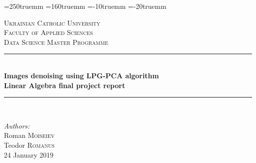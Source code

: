 \textheight=250truemm \textwidth=160truemm 
\hoffset=-10truemm \voffset=-20truemm



\begin{titlepage}

\newcommand{\HRule}{\rule{\linewidth}{0.5mm}} %

\center %
 

\textsc{\LARGE Ukrainian Catholic University}\\[1cm] %
\textsc{\Large  Faculty of Applied Sciences}\\[0.5cm] %
\textsc{\large Data Science Master Programme}\\[0.5cm] %

\vspace*{1cm}

\HRule \\[0.4cm]
{ \huge \bfseries Images denoising using LPG-PCA algorithm}\\[10pt]
{\Large \bfseries Linear Algebra final project report}\\[0.4cm] %
\HRule \\[1cm]
 
\vspace*{1cm}

\Large \emph{Authors:}\\
Roman \textsc{Moiseiev}\\Teodor \textsc{Romanus}\\[1cm] %

\vspace*{1cm}
{\large 24 January 2019}\\[2cm] %


\end{titlepage}
